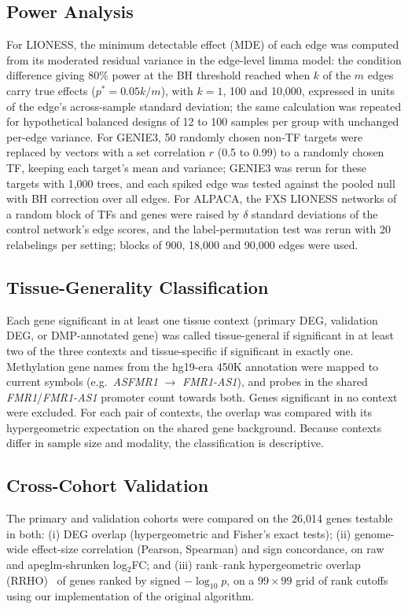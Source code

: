 \documentclass[journal]{IEEEtran}
\newcommand{\gene}[1]{\textit{#1}}
\begin{document}
\subsection{Power Analysis}\label{sec:power}
For LIONESS, the minimum detectable effect (MDE) of each edge was computed from its moderated residual variance in the edge-level limma model: the condition difference giving 80\% power at the BH threshold reached when $k$ of the $m$ edges carry true effects ($p^*=0.05k/m$), with $k=1$, 100 and 10,000, expressed in units of the edge's across-sample standard deviation; the same calculation was repeated for hypothetical balanced designs of 12 to 100 samples per group with unchanged per-edge variance. For GENIE3, 50 randomly chosen non-TF targets were replaced by vectors with a set correlation $r$ (0.5 to 0.99) to a randomly chosen TF, keeping each target's mean and variance; GENIE3 was rerun for these targets with 1,000 trees, and each spiked edge was tested against the pooled null with BH correction over all edges. For ALPACA, the FXS LIONESS networks of a random block of TFs and genes were raised by $\delta$ standard deviations of the control network's edge scores, and the label-permutation test was rerun with 20 relabelings per setting; blocks of 900, 18,000 and 90,000 edges were used.

\subsection{Tissue-Generality Classification}\label{sec:tissue}
Each gene significant in at least one tissue context (primary DEG, validation DEG, or DMP-annotated gene) was called tissue-general if significant in at least two of the three contexts and tissue-specific if significant in exactly one. Methylation gene names from the hg19-era 450K annotation were mapped to current symbols (e.g.\ \gene{ASFMR1} $\rightarrow$ \gene{FMR1-AS1}), and probes in the shared \gene{FMR1}/\gene{FMR1-AS1} promoter count towards both. Genes significant in no context were excluded. For each pair of contexts, the overlap was compared with its hypergeometric expectation on the shared gene background. Because contexts differ in sample size and modality, the classification is descriptive.

\subsection{Cross-Cohort Validation}
The primary and validation cohorts were compared on the 26,014 genes testable in both: (i) DEG overlap (hypergeometric and Fisher's exact tests); (ii) genome-wide effect-size correlation (Pearson, Spearman) and sign concordance, on raw and apeglm-shrunken log$_2$FC; and (iii) rank--rank hypergeometric overlap (RRHO)~\cite{rrho} of genes ranked by signed $-\log_{10}p$, on a $99\times99$ grid of rank cutoffs using our implementation of the original algorithm.
\end{document}
